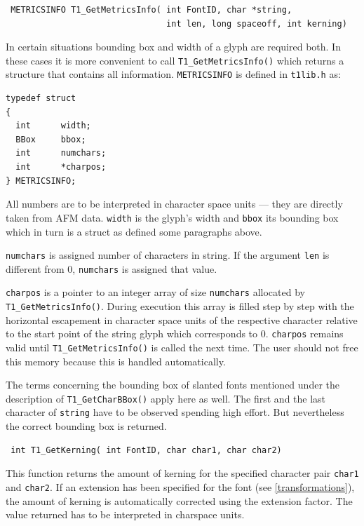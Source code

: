 \precorr
\begin{verbatim}
 METRICSINFO T1_GetMetricsInfo( int FontID, char *string,
                                int len, long spaceoff, int kerning)
\end{verbatim}\postcorr
In certain situations bounding box and width of a glyph are required both. In
these cases it is more convenient to call \verb+T1_GetMetricsInfo()+ which
returns a structure that contains all information. \verb+METRICSINFO+ is
defined in \verb+t1lib.h+ as:
\begin{verbatim}
typedef struct
{
  int      width;
  BBox     bbox;
  int      numchars;
  int      *charpos;
} METRICSINFO;
\end{verbatim}
All numbers are to be interpreted in character space units --- they are
directly taken from AFM data. \verb+width+ is the glyph's width and
\verb+bbox+ its bounding box which in turn is a struct as defined some
paragraphs above.

\verb+numchars+ is assigned number of characters in string. If the argument
\verb+len+ is different from 0, \verb+numchars+ is assigned that value.

\verb+charpos+ is a pointer to an integer array of size \verb+numchars+
allocated by \verb+T1_GetMetricsInfo()+. During execution this array is filled
step by step with the horizontal escapement in character space units of the
respective character relative to the start point of the string glyph which
corresponds to 0. \verb+charpos+ remains valid until
\verb+T1_GetMetricsInfo()+ is called the next time. The user should not
free this memory because this is handled automatically.

The terms concerning the bounding box of slanted fonts mentioned under the
description of \verb+T1_GetCharBBox()+ apply here as well. The first and the
last character of \verb+string+ have to be observed spending high effort.
But nevertheless the correct bounding box is returned.

\precorr
\begin{verbatim}
 int T1_GetKerning( int FontID, char char1, char char2)
\end{verbatim}\postcorr
This function returns the amount of kerning for the specified character
pair \verb+char1+ and \verb+char2+. If an extension has been specified
for the font (see \ref{transformations}), the amount of
kerning is automatically corrected using the extension factor. The
value returned has to be interpreted in charspace units.

